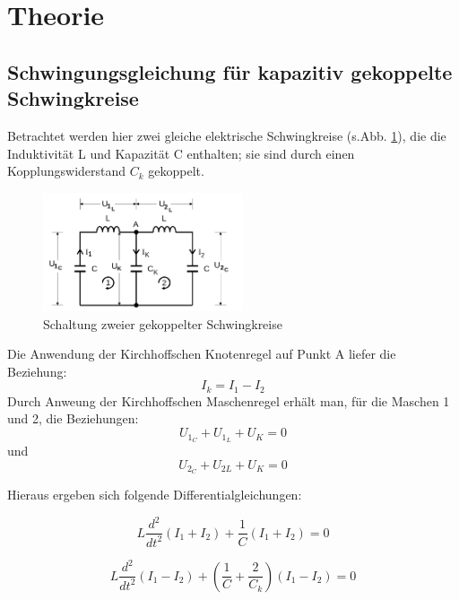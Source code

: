 \section{Theorie}
\label{sec:Theorie}


\subsection{Schwingungsgleichung für kapazitiv gekoppelte Schwingkreise}
Betrachtet werden hier zwei gleiche elektrische Schwingkreise (s.Abb. \ref{fig:Abb2}), die die Induktivität L und Kapazität C enthalten;
sie sind durch einen Kopplungswiderstand $ C_k$ gekoppelt.
\begin{figure}
  \centering
  \includegraphics[height=3.5cm]{./logos/Abb2.png}
  \caption{Schaltung zweier gekoppelter Schwingkreise\cite{sample}}
  \label{fig:Abb2}
\end{figure}
\FloatBarrier
Die Anwendung der Kirchhoffschen Knotenregel auf Punkt A liefer die Beziehung:
\begin{equation}
 I_k = I_1 - I_2
 \label{eqn:KK}
\end{equation}
Durch Anweung der Kirchhoffschen Maschenregel erhält man, für die Maschen 1 und 2, die Beziehungen:
\begin{equation}
  U_{1_{C}} + U_{1_{L}} + U_K = 0
  \label{eqn:KM1}
\end{equation}
 und
 \begin{equation}
   U_{2_{C}} + U_{2{L}} + U_K = 0
   \label{eqn:KM2}
 \end{equation}

Hieraus ergeben sich folgende Differentialgleichungen:

\begin{equation}
  L \frac{d^2}{dt^2}(I_1 + I_2) + \frac{1}{C} (I_1 + I_2) = 0
  \label{eqn:Diff1p}
\end{equation}

\begin{equation}
  L \frac{d^2}{dt^2}(I_1 - I_2) + \left(\frac{1}{C} + \frac{2}{C_k}\right) (I_1 - I_2) = 0
  \label{eqn:Diff2m}
\end{equation}

